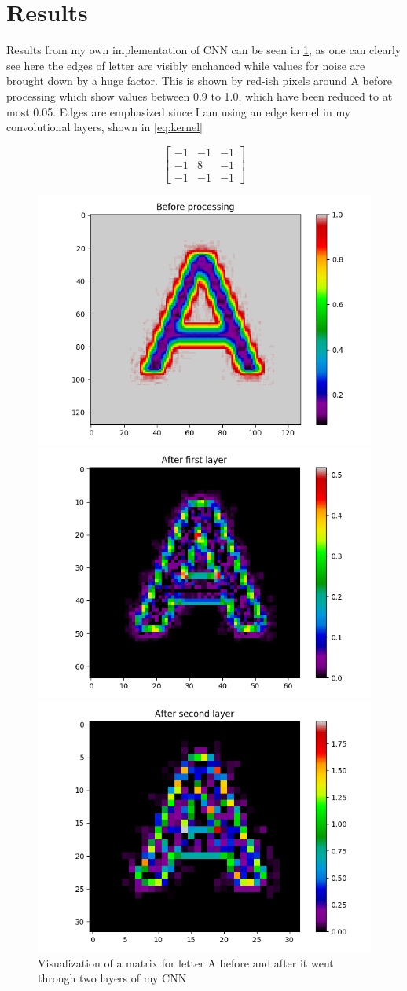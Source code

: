 \documentclass[conference]{IEEEtran}
\begin{document}
\section{Results}
Results from my own implementation of CNN can be seen in \cref{fig:FirstPart}, as one can clearly see here the edges of letter are visibly enchanced while values for noise are brought down by a huge factor. This is shown by red-ish pixels around A before processing which show values between 0.9 to 1.0, which have been reduced to at most 0.05. Edges are emphasized since I am using an edge kernel in my convolutional layers, shown in \cref{eq:kernel}

\begin{equation}
\begin{bmatrix} 
-1 & -1 & -1 \\ 
-1 & 8 & -1 \\ 
-1 & -1 & -1
\end{bmatrix}
\label{eq:kernel}
\end{equation}

\begin{figure}[htbp]
  \centerline{\includegraphics[width=.5\textwidth]{A_Zero_Layer}}
  \centerline{\includegraphics[width=.5\textwidth]{A_First_Layer}}
  \centerline{\includegraphics[width=.5\textwidth]{A_Second_Layer}}
\caption{Visualization of a matrix for letter A before and after it went through two layers of my CNN}
\label{fig:FirstPart}
\end{figure}
\end{document}
